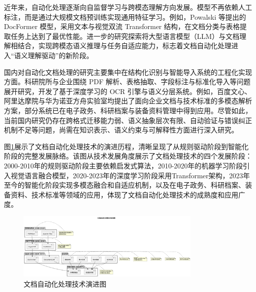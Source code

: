 近年来，自动化处理逐渐向自监督学习与跨模态理解方向发展。模型不再依赖人工标注，而是通过大规模文档预训练实现通用特征学习。例如，Powalski 等提出的 DocFormer 模型\cite{Powalski2021DocFormer}，采用文本与视觉双流 Transformer 结构，在文档分类与表格提取任务上达到了最优性能。进一步的研究探索将大型语言模型（LLM）与文档理解相结合，实现跨模态语义推理与任务自适应能力\cite{Wang2023DocumentLLM}，标志着文档自动化处理进入“语义理解驱动”的新阶段。

国内对自动化文档处理的研究主要集中在结构化识别与智能导入系统的工程化实现方面。科研院所与企业围绕 PDF 解析、表格抽取、字段标注与标准化导入等问题展开研究，开发了基于深度学习的 OCR 引擎与语义分层系统。例如，百度文心、阿里达摩院与华为诺亚方舟实验室均提出了面向企业文档与技术标准的多模态解析方案，部分系统已在电子政务、科研档案与装备资料管理中得到应用。尽管如此，当前国内研究仍存在跨格式迁移能力弱、语义抽象层次有限、自动验证与错误纠正机制不足等问题，尚需在知识表示、语义约束与可解释性方面进行深入研究。

图\ref{fig_document_processing_evolution}展示了文档自动化处理技术的演进历程，清晰呈现了从规则驱动阶段到智能化阶段的完整发展脉络。该图从技术发展角度展示了文档处理技术的四个发展阶段：2000-2010年的规则驱动阶段主要依赖启发式算法，2010-2020年的机器学习阶段引入视觉语言融合模型，2020-2023年的深度学习阶段采用Transformer架构，2023年至今的智能化阶段实现多模态融合和自适应机制，以及在电子政务、科研档案、装备资料、技术标准等领域的应用，体现了文档自动化处理技术的成熟度和应用广度。

\begin{figure}[H]
    \centering
    \includegraphics[width=0.8\textwidth,height=0.6\textheight,keepaspectratio]{chapters/fig-0/document_processing_evolution.png}
    \caption{文档自动化处理技术演进图}
    \label{fig_document_processing_evolution}
\end{figure}

